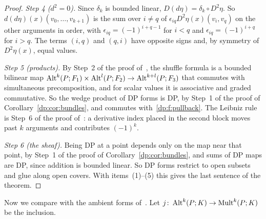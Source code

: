\begin{proof}
\emph{Step 4 ($d^2=0$).} Since $\delta_k$ is bounded linear, $D(d\eta)=\delta_k\circ D^2\eta$. So $d(d\eta)(x)(v_0,\dots,v_{k+1})$ is the sum over $i\ne q$ of $\epsilon_{iq}D^2\eta(x)(v_i,v_q)$ on the other arguments in order, with $\epsilon_{iq}=(-1)^{i+q-1}$ for $i<q$ and $\epsilon_{iq}=(-1)^{i+q}$ for $i>q$. The terms $(i,q)$ and $(q,i)$ have opposite signs and, by symmetry of $D^2\eta(x)$, equal values.

\emph{Step 5 (products).} By Step~2 of the proof of~\cite[Theorem~10.7]{I}, the shuffle formula is a bounded bilinear map $\operatorname{Alt}^k(P;F_1)\times\operatorname{Alt}^l(P;F_2)\to\operatorname{Alt}^{k+l}(P;F_3)$ that commutes with simultaneous precomposition, and for scalar values it is associative and graded commutative. So the wedge product of DP forms is DP, by Step~1 of the proof of Corollary~\ref{dp:cor:bundles}, and commutes with~\eqref{dp:f:pullback}. The Leibniz rule is Step~6 of the proof of~\cite[Theorem~10.7]{I}: a derivative index placed in the second block moves past $k$ arguments and contributes $(-1)^k$.

\emph{Step 6 (the sheaf).} Being DP at a point depends only on the map near that point, by Step~1 of the proof of Corollary~\ref{dp:cor:bundles}, and sums of DP maps are DP, since addition is bounded linear. So DP forms restrict to open subsets and glue along open covers. With items~(1)--(5) this gives the last sentence of the theorem.
\end{proof}

Now we compare with the ambient forms of~\cite[Section~10.3]{I}. Let $j\colon\operatorname{Alt}^k(P;K)\to\operatorname{Mult}^k(P;K)$ be the inclusion.

